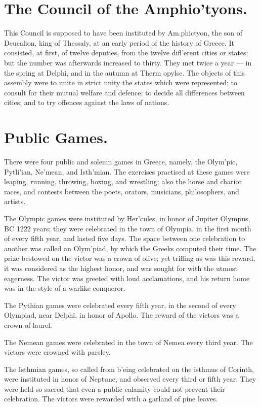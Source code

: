 \documentclass[openany,a4paper]{memoir}
\begin{document}
\section{The Council of the Amphio'tyons.}

This Council is supposed to have been instituted by Am.phictyon, the son of 
Deucalion, king of Thessaly, at an early period of the history of Greece. It consisted, at first, of twelve deputies, 
from the twelve difl'erent cities or states; but the number 
was afterwards increased to thirty. They met twice a year — 
in the spring at Delphi, and in the autumn at Therm opylse. 
The objects of this assembly were to unite in strict unity the 
states which were represented; to consult for their mutual 
welfare and defence; to decide all differences between cities; 
and to try offences against the laws of nations. 

\section{Public Games.}

There were four public and solemn games 
in Greece, namely, the Olym'pic, Pytli'ian, Ne'mean, and 
Isth'mian. The exercises practised at these games were 
leaping, running, throwing, boxing, and wrestling; also the 
horse and chariot races, and contests between the poets, orators, musicians, philosophers, and artists. 

The Olympic games were instituted by Her'cules, in honor 
of Jupiter Olympus, BC 1222 years; they were celebrated 
in the town of Olympia, in the first month of every fifth year, 
and lasted five days. The space between one celebration to 
another was called an Olym'piad, by which the Greeks computed their time. The prize bestowed on the victor was a 
crown of olive; yet trifling as was this reward, it was considered as the highest honor, and was sought for with the 
utmost eagerness. The victor was greeted with loud acclamations, and his return home was in the style of a warlike 
conqueror. 

The Pythian games were celebrated every fifth year, in the 
second of every Olympiad, near Delphi, in honor of Apollo. 
The reward of the victors was a crown of laurel. 

The Nemean games were celebrated in the town of Nemea 
every third year. The victors were crowned with parsley. 

The Isthmian games, so called from b'eing celebrated on 
the isthmus of Corinth, were instituted in honor of Neptune, 
and observed every third or fifth year. They were held so 
sacred that even a public calamity could not prevent their 
celebration. The victors were rewarded with a garland of 
pine leaves. 
\end{document}
